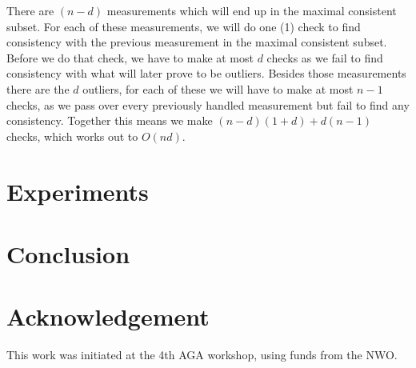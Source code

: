 \documentclass{article}
\begin{document}
There are \((n-d)\) measurements which will end up in the maximal consistent subset. For each of these measurements, we will do one (1) check to find consistency with the previous measurement in the maximal consistent subset. Before we do that check, we have to make at most \(d\) checks as we fail to find consistency with what will later prove to be outliers.
Besides those measurements there are the \(d\) outliers, for each of these we will have to make at most \(n-1\) checks, as we pass over every previously handled measurement but fail to find any consistency.
Together this means we make \((n-d)(1+d) + d(n-1)\) checks, which works out to \(O(nd)\).

\section{Experiments}
\section{Conclusion}
\section{Acknowledgement}
This work was initiated at the 4th AGA workshop, using funds from the NWO.
\end{document}
